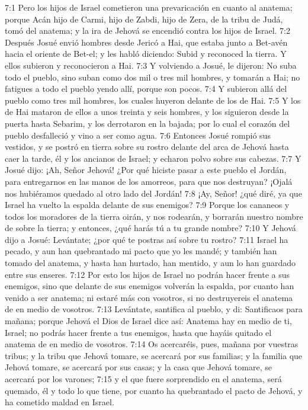 7:1 Pero los hijos de Israel cometieron una prevaricación en cuanto al anatema; porque Acán hijo de Carmi, hijo de Zabdi, hijo de Zera, de la tribu de Judá, tomó del anatema; y la ira de Jehová se encendió contra los hijos de Israel.  
7:2 Después Josué envió hombres desde Jericó a Hai, que estaba junto a Bet-avén hacia el oriente de Bet-el; y les habló diciendo: Subid y reconoced la tierra. Y ellos subieron y reconocieron a Hai.  
7:3 Y volviendo a Josué, le dijeron: No suba todo el pueblo, sino suban como dos mil o tres mil hombres, y tomarán a Hai; no fatigues a todo el pueblo yendo allí, porque son pocos.  
7:4 Y subieron allá del pueblo como tres mil hombres, los cuales huyeron delante de los de Hai.  
7:5 Y los de Hai mataron de ellos a unos treinta y seis hombres, y los siguieron desde la puerta hasta Sebarim, y los derrotaron en la bajada; por lo cual el corazón del pueblo desfalleció y vino a ser como agua.  
7:6 Entonces Josué rompió sus vestidos, y se postró en tierra sobre su rostro delante del arca de Jehová hasta caer la tarde, él y los ancianos de Israel; y echaron polvo sobre sus cabezas.  
7:7 Y Josué dijo: ¡Ah, Señor Jehová! ¿Por qué hiciste pasar a este pueblo el Jordán, para entregarnos en las manos de los amorreos, para que nos destruyan? ¡Ojalá nos hubiéramos quedado al otro lado del Jordán!  
7:8 ¡Ay, Señor! ¿qué diré, ya que Israel ha vuelto la espalda delante de sus enemigos?  
7:9 Porque los cananeos y todos los moradores de la tierra oirán, y nos rodearán, y borrarán nuestro nombre de sobre la tierra; y entonces, ¿qué harás tú a tu grande nombre?  
7:10 Y Jehová dijo a Josué: Levántate; ¿por qué te postras así sobre tu rostro?  
7:11 Israel ha pecado, y aun han quebrantado mi pacto que yo les mandé; y también han tomado del anatema, y hasta han hurtado, han mentido, y aun lo han guardado entre sus enseres.  
7:12 Por esto los hijos de Israel no podrán hacer frente a sus enemigos, sino que delante de sus enemigos volverán la espalda, por cuanto han venido a ser anatema; ni estaré más con vosotros, si no destruyereis el anatema de en medio de vosotros.  
7:13 Levántate, santifica al pueblo, y di: Santificaos para mañana; porque Jehová el Dios de Israel dice así: Anatema hay en medio de ti, Israel; no podrás hacer frente a tus enemigos, hasta que hayáis quitado el anatema de en medio de vosotros.  
7:14 Os acercaréis, pues, mañana por vuestras tribus; y la tribu que Jehová tomare, se acercará por sus familias; y la familia que Jehová tomare, se acercará por sus casas; y la casa que Jehová tomare, se acercará por los varones;  
7:15 y el que fuere sorprendido en el anatema, será quemado, él y todo lo que tiene, por cuanto ha quebrantado el pacto de Jehová, y ha cometido maldad en Israel.  
